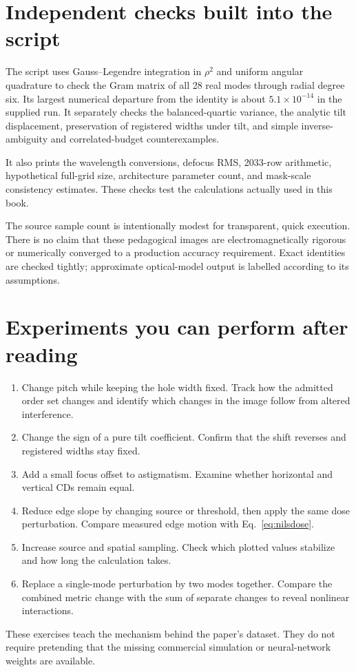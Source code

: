 
\section{Independent checks built into the script}
The script uses Gauss--Legendre integration in $\rho^2$ and uniform
angular quadrature to check the Gram matrix of all 28 real modes
through radial degree six. Its largest numerical departure from
the identity is about $5.1\times10^{-14}$ in the supplied run.
It separately checks the balanced-quartic variance, the analytic
tilt displacement, preservation of registered widths under tilt, and
simple inverse-ambiguity and correlated-budget counterexamples.

It also prints the wavelength conversions, defocus RMS, 2033-row
arithmetic, hypothetical full-grid size, architecture parameter count,
and mask-scale consistency estimates. These checks test the calculations
actually used in this book.

The source sample count is intentionally modest for transparent,
quick execution. There is no claim that these pedagogical images are
electromagnetically rigorous or numerically converged to a production
accuracy requirement. Exact identities are checked tightly; approximate
optical-model output is labelled according to its assumptions.

\section{Experiments you can perform after reading}
\begin{enumerate}
\item Change pitch while keeping the hole width fixed. Track how the
admitted order set changes and identify which changes in the image
follow from altered interference.
\item Change the sign of a pure tilt coefficient. Confirm that the
shift reverses and registered widths stay fixed.
\item Add a small focus offset to astigmatism. Examine whether horizontal
and vertical CDs remain equal.
\item Reduce edge slope by changing source or threshold, then apply the
same dose perturbation. Compare measured edge motion with
Eq.~\eqref{eq:nilsdose}.
\item Increase source and spatial sampling. Check which plotted values
stabilize and how long the calculation takes.
\item Replace a single-mode perturbation by two modes together. Compare
the combined metric change with the sum of separate changes to reveal
nonlinear interactions.
\end{enumerate}
These exercises teach the mechanism behind the paper's dataset.
They do not require pretending that the missing commercial simulation
or neural-network weights are available.
